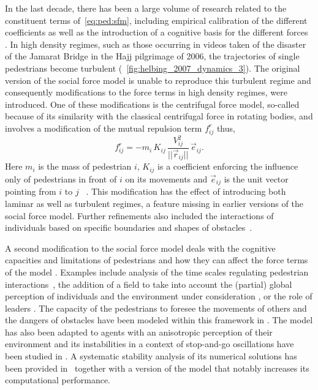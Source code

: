 In the last decade, there has been a large volume of research related to the constituent terms of~\equationname\eqref{eq:ped:sfm}, including empirical calibration of the different coefficients as well as the introduction of a cognitive basis for the different forces~ \cite{zainuddin_2010_characteristics, johansson_2008_crowd}. In high density regimes,  such as those occurring in videos taken of the disaster of the Jamarat Bridge in the Hajj pilgrimage of 2006, the trajectories of single pedestrians become turbulent \cite{helbing_2007_dynamics,johansson_2008_crowd} (\figurename~\ref{fig:helbing_2007_dynamics_3}). The original version of the social force model is unable to  reproduce this turbulent regime and consequently modifications to the force terms in high density regimes, were introduced. One of these modifications is the centrifugal force model, so-called because of its similarity with the classical centrifugal force in rotating bodies, and involves a modification of the mutual repulsion term $ f_{ij}^r $ thus,\begin{equation}
f_{ij}^r  =  -m_i \, K_{ij} \, \frac{V_{ij}^2}{||\vec{r}_{ij}||} \, \vec{e}_{ij}. 
\end{equation}
Here $m_i$ is the mass of pedestrian $i$, $K_{ij}$ is a coefficient enforcing the influence only of pedestrians in front of $i$ on its movements and $\vec{e}_{ij}$ is the unit vector pointing from $i$ to $j$~\cite{yu_2005_centrifugal,yu_2007_modeling} . This modification has the effect of introducing both laminar as well as turbulent regimes, a feature missing in earlier versions of the social force model. Further refinements also included the interactions of individuals based on specific boundaries and shapes of obstacles~\cite{chraibi_2010_generalized}. 

A second modification to the social force model deals with the cognitive capacities and limitations of pedestrians and how they can affect the force terms of the model \cite{moussaid_2009_experimental,moussaid_2011_how}. 
Examples include analysis of the time scales regulating pedestrian interactions~\cite{johansson_2009_constant}, the addition of a field to take into account the (partial) global perception of individuals and the environment under consideration \cite{dietrich_2014_gradient,colombi_2015_moving}, or the role of leaders \cite{degond_2015_time}. The capacity of the pedestrians to foresee the movements of others and the dangers of obstacles have been modeled within this framework in \cite{moussaid_2009_experimental,steffen_2009_modification}. The model has also been adapted to agents with an anisotropic perception of their environment \cite{gulikers_2013_effect} and its instabilities in a context of stop-and-go oscillations have been studied in \cite{chraibi_2014_oscillating,chraibi_2015_jamming}. A systematic stability analysis of its numerical solutions has been provided in~\cite{koster_2013_avoiding} together with a version of the model that notably increases its computational performance. 

